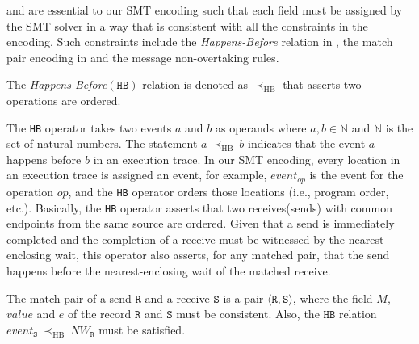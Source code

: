  and  are essential to our SMT encoding such that each field must be assigned by the SMT solver in a way that is consistent with all the constraints in the encoding. Such constraints include the \emph{Happens-Before} relation in , the match pair encoding in  and the message non-overtaking rules.

\begin{definition}
The \emph{Happens-Before}$(\mathtt{HB})$ relation is denoted as $\mathrm{\prec_{HB}}$ that asserts two operations are ordered.
\label{def:hb}
\end{definition}

The \texttt{HB} operator takes two events $a$ and $b$ as operands where $a,b \in \mathbb{N}$ and $\mathbb{N}$ is the set of natural numbers. The statement $a\ \mathrm{\prec_{HB}}\ b$ indicates that the event $a$ happens before $b$ in an execution trace. In our SMT encoding, every location in an execution trace is assigned an event, for example, $\mathit{event}_{op}$ is the event for the operation $\mathit{op}$,  and the \texttt{HB} operator orders those locations (i.e., program order, etc.). Basically, the \texttt{HB} operator asserts that two receives(sends) with common endpoints from the same source are ordered. Given that a send is immediately completed and the completion of a receive must be witnessed  by the nearest-enclosing wait, this operator also asserts, for any matched pair, that the send happens before the nearest-enclosing wait of the matched receive.

\begin{definition}
The match pair of a send $\mathtt{R}$ and a receive $\mathtt{S}$ is a pair $\langle\mathtt{R}, \mathtt{S}\rangle$, where the field $M$, $value$ and $e$ of the record $\mathtt{R}$ and $\mathtt{S}$ must be consistent. Also, the $\mathtt{HB}$ relation $event_{\mathtt{S}}\ \mathrm{\prec_{HB}}\ NW_{\mathtt{R}}$ must be satisfied.
\label{def:match}
\end{definition}

